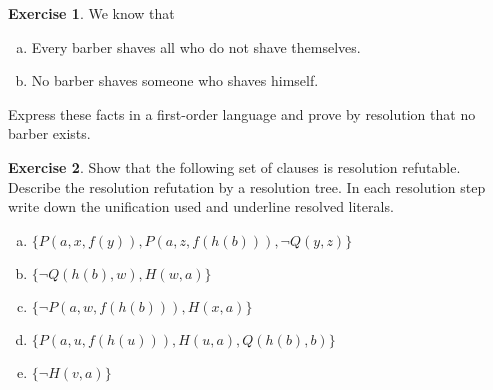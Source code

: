 \documentclass[11pt,a4paper]{amsart}
\theoremstyle{definition}
\newtheorem{problem}{Exercise}
\theoremstyle{remark}
\begin{document}
\bigskip

\begin{problem} We know that
\medskip
\begin{enumerate}[(a)]
\itemsep12pt
\item Every barber shaves all who do not shave themselves.
\item No barber shaves someone who shaves himself.
\end{enumerate}
\medskip
Express these facts in a first-order language and prove by resolution that no barber exists.
\end{problem}

\bigskip

\begin{problem}
Show that the following set of clauses is resolution refutable. Describe the resolution refutation by a resolution tree. In each resolution step write down the unification used and underline resolved literals.

\medskip
\begin{enumerate}[(a)]
\itemsep12pt
\item $\{P(a,x,f(y)),P(a,z,f(h(b))),\neg Q(y,z)\}$
\item $\{\neg Q(h(b),w),H(w,a)\}$
\item $\{\neg P(a,w,f(h(b))),H(x,a)\}$
\item $\{P(a,u,f(h(u))),H(u,a),Q(h(b),b)\}$
\item $\{\neg H(v,a)\}$
\end{enumerate}
\end{problem}
\end{document}
